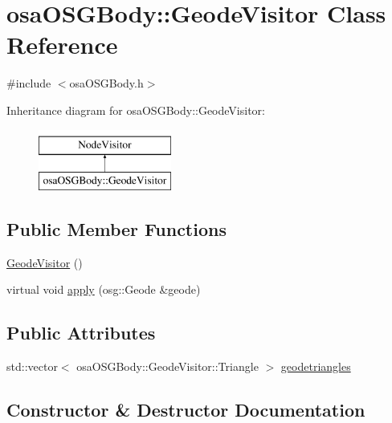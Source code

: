 \hypertarget{classosa_o_s_g_body_1_1_geode_visitor}{}\section{osa\+O\+S\+G\+Body\+:\+:Geode\+Visitor Class Reference}
\label{classosa_o_s_g_body_1_1_geode_visitor}


{\ttfamily \#include $<$osa\+O\+S\+G\+Body.\+h$>$}

Inheritance diagram for osa\+O\+S\+G\+Body\+:\+:Geode\+Visitor\+:\begin{figure}[H]
\begin{center}
\leavevmode
\includegraphics[height=2.000000cm]{dc/d75/classosa_o_s_g_body_1_1_geode_visitor}
\end{center}
\end{figure}
\subsection*{Public Member Functions}
\begin{DoxyCompactItemize}
\item 
\hyperlink{classosa_o_s_g_body_1_1_geode_visitor_aa200b5701e66d9ef08d8ec6f24961d93}{Geode\+Visitor} ()
\item 
virtual void \hyperlink{classosa_o_s_g_body_1_1_geode_visitor_affc208aeaa79c67b3caa86a15622a977}{apply} (osg\+::\+Geode \&geode)
\end{DoxyCompactItemize}
\subsection*{Public Attributes}
\begin{DoxyCompactItemize}
\item 
std\+::vector$<$ osa\+O\+S\+G\+Body\+::\+Geode\+Visitor\+::\+Triangle $>$ \hyperlink{classosa_o_s_g_body_1_1_geode_visitor_ad8732c666c1f96f994cbcb54c6e164a1}{geodetriangles}
\end{DoxyCompactItemize}


\subsection{Constructor \& Destructor Documentation}
\hypertarget{classosa_o_s_g_body_1_1_geode_visitor_aa200b5701e66d9ef08d8ec6f24961d93}{}

